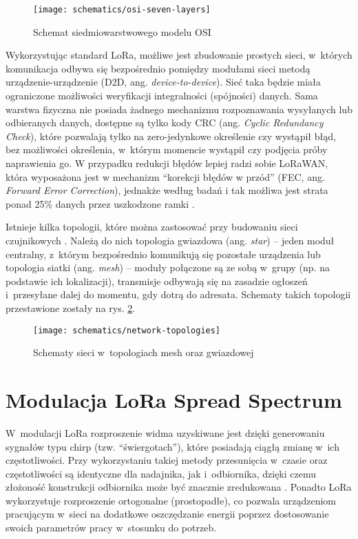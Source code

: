 \begin{figure}[!htbp]
    \centering
    \texttt{[image: schematics/osi-seven-layers]}
    \caption{\label{img:osi-seven-layer}Schemat siedmiowarstwowego modelu OSI}
\end{figure}

\FloatBarrier
Wykorzystując standard LoRa, możliwe jest zbudowanie prostych sieci, w~których komunikacja odbywa się bezpośrednio
pomiędzy modułami sieci metodą urządzenie-urządzenie (D2D, ang. \textsl{device-to-device}). Sieć taka będzie miała
ograniczone możliwości weryfikacji integralności (spójności) danych. Sama warstwa fizyczna nie posiada żadnego
mechanizmu rozpoznawania wysyłanych lub odbieranych danych, dostępne są tylko kody CRC (ang. \textsl{Cyclic Redundancy
    Check}), które pozwalają tylko na zero-jedynkowe określenie czy wystąpił błąd, bez możliwości określenia, w~którym
momencie wystąpił czy podjęcia próby naprawienia go. W przypadku redukcji błędów lepiej radzi sobie LoRaWAN, która
wyposażona jest w mechanizm \enquote{korekcji błędów w przód} (FEC, ang. \textsl{Forward Error Correction}), jednakże
według badań i tak możliwa jest strata ponad 25\% danych przez uszkodzone ramki \cite{lora-crc}.

Istnieje kilka topologii, które można zastosować przy budowaniu sieci czujnikowych \cite{network-topologies}. Należą do
nich topologia gwiazdowa (ang. \textsl{star}) -- jeden moduł centralny, z~którym bezpośrednio komunikują się pozostałe
urządzenia lub topologia siatki (ang. \textsl{mesh}) -- moduły połączone są ze sobą w~grupy (np. na podstawie ich
lokalizacji), transmisje odbywają się na zasadzie ogłoszeń i~przesyłane dalej do momentu, gdy dotrą do adresata.
Schematy takich topologii przestawione zostały na rys. \ref{img:network-topologies}.

\begin{figure}[!htbp]
    \centering
    \texttt{[image: schematics/network-topologies]}
    \caption{\label{img:network-topologies}Schematy sieci w~topologiach mesh oraz gwiazdowej}
\end{figure}

\FloatBarrier
\section{\label{sect:lora-modulation}Modulacja LoRa Spread Spectrum} W~modulacji LoRa rozproszenie widma uzyskiwane jest
dzięki generowaniu sygnałów typu chirp (tzw. \enquote{świergotach}), które posiadają ciągłą zmianę w~ich częstotliwości.
Przy wykorzystaniu takiej metody przesunięcia w~czasie oraz częstotliwości są identyczne dla nadajnika, jak
i~odbiornika, dzięki czemu złożoność konstrukcji odbiornika może być znacznie zredukowana
\cite{lora-modulation-basics,dedicated-network-iot}. Ponadto LoRa wykorzystuje rozproszenie ortogonalne (prostopadłe),
co pozwala urządzeniom pracującym w~sieci na dodatkowe oszczędzanie energii poprzez dostosowanie swoich parametrów pracy
w~stosunku do potrzeb.

